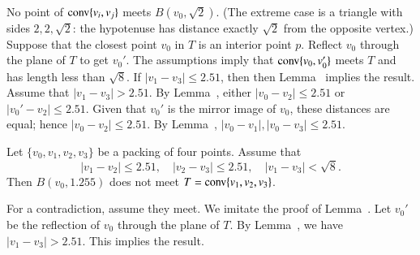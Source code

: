 \begin{tarskidata}
\begin{tarski}
\begin{proved}
No point of ${\operatorname{conv}}\{v_i,v_j\}$ meets $B(v_0,\sqrt2)$.  (The
extreme case is a triangle with sides $2,2,\sqrt2$: the hypotenuse
has distance exactly $\sqrt2$ from the opposite vertex.)
Suppose that the closest point $v_0$ in
$T$ is an interior point $p$. Reflect $v_0$
through the plane of $T$ to get $v_0'$. The assumptions imply
that ${\operatorname{conv}}\{v_0,v_0'\}$ meets $T$ and has
length less than $\sqrt8$. If $|v_1-v_3|\le2.51$, then
then Lemma~ implies the result.
Assume that $|v_1-v_3|>2.51$.
By Lemma~,  
either $|v_0-v_2|\le2.51$ or $|v_0'-v_2|\le 2.51$.  Given that
$v_0'$ is the mirror image of $v_0$, these distances are equal;
hence $|v_0-v_2|\le 2.51$.  By Lemma~,
$|v_0-v_1|,|v_0-v_3|\le 2.51$.
\swallowed\end{proved}
\end{tarski}


\begin{tarski}

\begin{lemma}
Let $\{v_0,v_1,v_2,v_3\}$ be a packing of four points. Assume that
$$
   |v_1-v_2|\le 2.51,\quad |v_2-v_3|\le 2.51,\quad |v_1-v_3|<\sqrt8.
$$
Then $B(v_0,1.255)$ does not meet $T={\operatorname{conv}}\{v_1,v_2,v_3\}$.
\end{lemma}


\begin{proved}   For a contradiction, assume they meet. 
We imitate the proof of Lemma~.
Let $v_0'$ be the reflection of $v_0$ through the plane of $T$.
By
Lemma~, we have $|v_1-v_3|>2.51$.
This implies the result.
\swallowed\end{proved}
\end{tarski}














\end{tarskidata}
